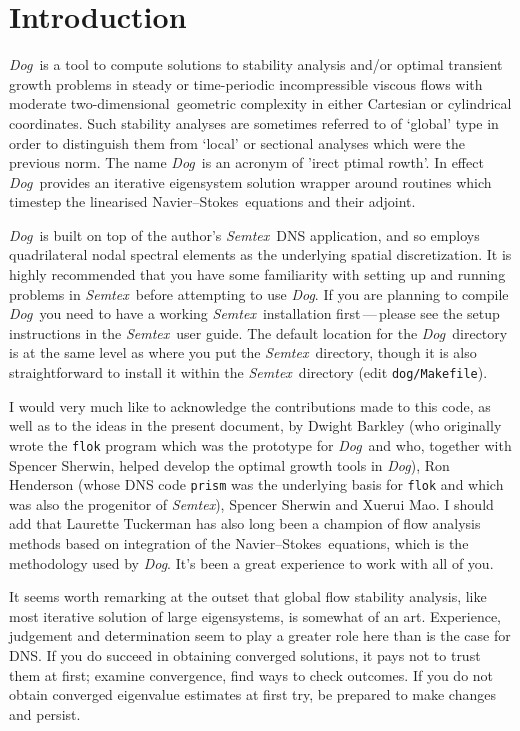 \documentclass[11pt,a4paper]{report}
\newcommand\NavSto{Navier--Stokes}
\newcommand\twod{two-di\-men\-sion\-al}
\newcommand{\Semtex}{\emph{Semtex}}
\newcommand{\Dog}{\emph{Dog}}
\newcommand\undertext[1]{\underline{\smash{\hbox{#1}}}}
\begin{document}
\tableofcontents

\clearpage

\chapter{Introduction}

\Dog\ is a tool to compute solutions to stability analysis and/or
optimal transient growth problems in steady or time-periodic
incompressible viscous flows with moderate \twod\ geometric complexity
in either Cartesian or cylindrical coordinates.  Such stability
analyses are sometimes referred to of `global' type in order to
distinguish them from `local' or sectional analyses which were the
previous norm.  The name \Dog\ is an acronym of '\undertext{d}irect
\undertext{o}ptimal \undertext{g}rowth'.
%
In effect \Dog\ provides an iterative eigensystem solution wrapper
around routines which timestep the linearised \NavSto\ equations and
their adjoint.

\Dog\ is built on top of the author's \Semtex\ DNS application, and so
employs quadrilateral nodal spectral elements as the underlying
spatial discretization. It is highly recommended that you have some
familiarity with setting up and running problems in \Semtex\ before
attempting to use \Dog. If you are planning to compile \Dog\ you need
to have a working \Semtex\ installation first\,---\,please see the
setup instructions in the \Semtex\ user guide.  The default location
for the \Dog\ directory is at the same level as where you put the
\Semtex\ directory, though it is also straightforward to install it
within the \Semtex\ directory (edit \verb+dog/Makefile+).

I would very much like to acknowledge the contributions made to this
code, as well as to the ideas in the present document, by Dwight
Barkley (who originally wrote the \texttt{flok} program which was the
prototype for \Dog\ and who, together with Spencer Sherwin, helped
develop the optimal growth tools in \Dog), Ron Henderson (whose DNS
code \texttt{prism} was the underlying basis for \texttt{flok} and
which was also the progenitor of \Semtex), Spencer Sherwin and Xuerui
Mao. I should add that Laurette Tuckerman has also long been a
champion of flow analysis methods based on integration of the
\NavSto\ equations, which is the methodology used by \Dog.  It's been
a great experience to work with all of you.

It seems worth remarking at the outset that global flow stability
analysis, like most iterative solution of large eigensystems, is
somewhat of an art.  Experience, judgement and determination seem to
play a greater role here than is the case for DNS.  If you do succeed
in obtaining converged solutions, it pays not to trust them at first;
examine convergence, find ways to check outcomes.  If you do not
obtain converged eigenvalue estimates at first try, be prepared to
make changes and persist. 
\end{document}
